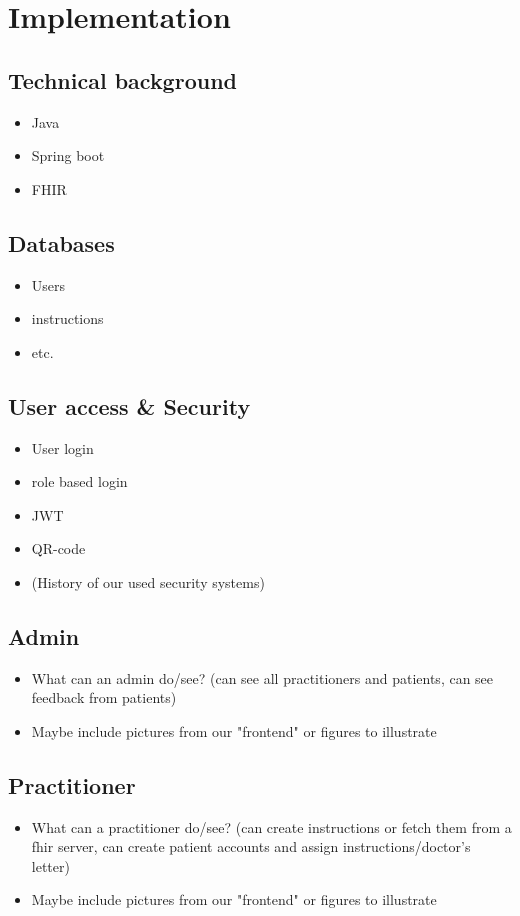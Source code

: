 \documentclass[]{report}
\begin{document}
\section{Implementation}

\subsection{Technical background}
\begin{itemize}
    \item Java
    \item Spring boot
    \item FHIR
\end{itemize}

\subsection{Databases}
\begin{itemize}
    \item Users
    \item instructions
    \item etc.
\end{itemize}

\subsection{User access \& Security}
\begin{itemize}
    \item User login
    \item role based login
    \item JWT
    \item QR-code
    \item (History of our used security systems)
\end{itemize}

\subsection{Admin}
\begin{itemize}
    \item What can an admin do/see? (can see all practitioners and patients, can see feedback from patients)
    \item Maybe include pictures from our "frontend" or figures to illustrate
\end{itemize}

\subsection{Practitioner}
\begin{itemize}
    \item What can a practitioner do/see? (can create instructions or fetch them from a fhir server, can create patient accounts and assign instructions/doctor's letter)
    \item Maybe include pictures from our "frontend" or figures to illustrate
\end{itemize}
\end{document}
